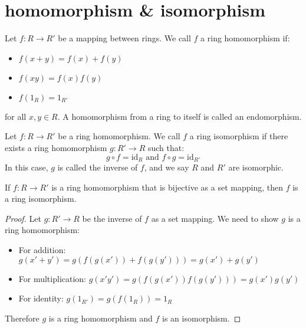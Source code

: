 \section{homomorphism \& isomorphism}

\begin{definition}
  Let $f : R \to R'$ be a mapping between rings. We call $f$ a ring homomorphism if:
  \begin{itemize}
    \item $f(x + y) = f(x) + f(y)$
    \item $f(xy) = f(x)f(y)$
    \item $f(1_R) = 1_{R'}$
  \end{itemize}
  for all $x,y \in R$. A homomorphism from a ring to itself is called an endomorphism.
\end{definition}

\begin{definition}
  Let $f : R \to R'$ be a ring homomorphism. We call $f$ a ring isomorphism if there exists a ring homomorphism $g : R' \to R$ such that:
  \[
    g \circ f = \text{id}_R \text{ and } f \circ g = \text{id}_{R'}
  \]
  In this case, $g$ is called the inverse of $f$, and we say $R$ and $R'$ are isomorphic.
\end{definition}

\begin{proposition}
  If $f : R \to R'$ is a ring homomorphism that is bijective as a set mapping, then $f$ is a ring isomorphism.
\end{proposition}

\begin{proof}
  Let $g : R' \to R$ be the inverse of $f$ as a set mapping.
  We need to show $g$ is a ring homomorphism:
  \begin{itemize}
    \item For addition: $g(x' + y') = g(f(g(x')) + f(g(y'))) = g(x') + g(y')$
    \item For multiplication: $g(x'y') = g(f(g(x'))f(g(y'))) = g(x')g(y')$
    \item For identity: $g(1_{R'}) = g(f(1_R)) = 1_R$
  \end{itemize}
  Therefore $g$ is a ring homomorphism and $f$ is an isomorphism.
\end{proof}

